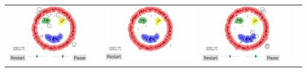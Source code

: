 \documentclass{beamer}
\begin{document}
\begin{frame}
{\begin{tabular}{cccc}
		\includegraphics[scale=0.15]{dbscan/8}&
		\includegraphics[scale=0.15]{dbscan/9}&
		\includegraphics[scale=0.15]{dbscan/10}\\
	\end{tabular}
}
\end{frame}
\end{document}
